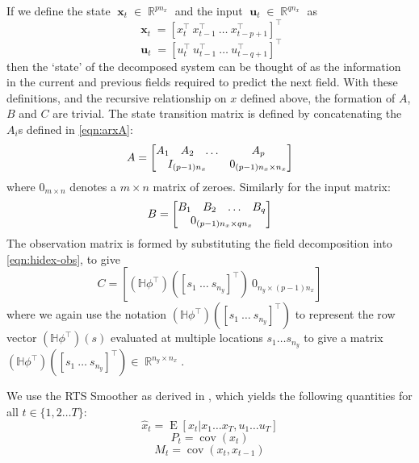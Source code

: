 \documentclass{IEEEtran}
\DeclareMathOperator{\E}{E}
\DeclareMathOperator{\R}{\mathbb{R}}
\DeclareMathOperator{\cov}{cov}
\DeclareMathOperator{\xvec}{\mathbf{x}}
\DeclareMathOperator{\uvec}{\mathbf{u}}
\begin{document}
If we define the state $\xvec_t \in \R^{pn_x}$ and the input $\uvec_t \in \R^{qn_x}$ as 
\begin{equation}
	\xvec_t = [x_t^\top ~ x_{t-1}^\top ~ \ldots ~ x_{t-p+1}^\top]^\top
\end{equation}
\begin{equation}
	\uvec_t = [u_t^\top ~ u_{t-1}^\top ~ \ldots ~ u_{t-q+1}^\top]^\top
\end{equation}
then the `state' of the decomposed system can be thought of as the information in the current and previous fields required to predict the next field. With these definitions, and the recursive relationship on $x$ defined above, the formation of $A$, $B$ and $C$ are trivial. The state transition matrix is defined by concatenating the $A_i$s defined in \ref{eqn:arxA}:
\begin{equation}
	A = \begin{bmatrix}
	A_1 & A_2 & \ldots & A_p \\
	\multicolumn{3}{c}{I_{(p-1)n_x}} & 0_{(p-1)n_x \times n_x}
	\end{bmatrix}
\end{equation}
where $0_{m\times n}$ denotes a $m\times n$ matrix of zeroes. Similarly for the input matrix:
\begin{equation}
	B = \begin{bmatrix}
	B_1 & B_2 & \ldots & B_q \\
	\multicolumn{4}{c}{0_{(p-1)n_x\times qn_x}}
	\end{bmatrix}
\end{equation}
The observation matrix is formed by substituting the field decomposition into \ref{eqn:hidex-obs}, to give
\begin{equation}
	C = [(\mathbb{H}\phi^\top)([s_1 ~ \ldots ~ s_{n_y}]^\top) ~ 0_{n_y \times (p-1)n_x}]
\end{equation}
where we again use the notation $(\mathbb{H}\phi^\top)([s_1 ~  \ldots ~ s_{n_y}]^\top)$ to represent the row vector $(\mathbb{H}\phi^\top)(s)$ evaluated at multiple locations $s_1 \ldots s_{n_y}$ to give a matrix $(\mathbb{H}\phi^\top)([s_1 ~  \ldots ~ s_{n_y}]^\top) \in \R^{n_y \times n_x}$.

We use the RTS Smoother as derived in \cite{Gibson}, which yields the following quantities for all $t \in \{1, 2 \ldots T\}$:
\begin{equation}
    \hat{x}_t = \E[x_t | x_1 \ldots x_T, u_1 \ldots u_T]
\end{equation}
\begin{equation}
    P_t = \cov(x_t)
\end{equation}
\begin{equation}
    M_t = \cov(x_t,x_{t-1})
\end{equation}
\end{document}
